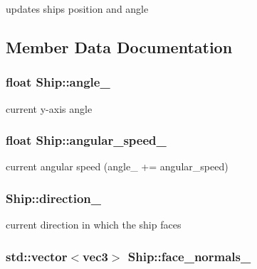 updates ships position and angle 



\subsection{Member Data Documentation}
\subsubsection[{\texorpdfstring{angle\+\_\+}{angle_}}]{\setlength{\rightskip}{0pt plus 5cm}float Ship\+::angle\+\_\+}\hypertarget{classShip_ac1eecf17b4d217e4379fe3b83082f570}{}\label{classShip_ac1eecf17b4d217e4379fe3b83082f570}


current y-\/axis angle 

\subsubsection[{\texorpdfstring{angular\+\_\+speed\+\_\+}{angular_speed_}}]{\setlength{\rightskip}{0pt plus 5cm}float Ship\+::angular\+\_\+speed\+\_\+}\hypertarget{classShip_a5ddc78691bc11038daf5b323579c1da9}{}\label{classShip_a5ddc78691bc11038daf5b323579c1da9}


current angular speed (angle\+\_\+ += angular\+\_\+speed) 

\subsubsection[{\texorpdfstring{direction\+\_\+}{direction_}}]{ Ship\+::direction\+\_\+}\hypertarget{classShip_aaf08394bcc18913a81303668cd865fa1}{}\label{classShip_aaf08394bcc18913a81303668cd865fa1}


current direction in which the ship faces 

\subsubsection[{\texorpdfstring{face\+\_\+normals\+\_\+}{face_normals_}}]{\setlength{\rightskip}{0pt plus 5cm}std\+::vector$<${\bf vec3}$>$ Ship\+::face\+\_\+normals\+\_\+\hspace{0.3cm}{\ttfamily [private]}}\hypertarget{classShip_aa7d1b82de97e0574a87c7d5abfee7fd3}{}\label{classShip_aa7d1b82de97e0574a87c7d5abfee7fd3}


